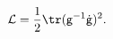 \begin{equation}
\label{lagrangian}
\mathcal{L} = \frac{1}{2} \tr(\mathsf{g}^{-1}\dot{\mathsf{g}})^2.
\end{equation}

